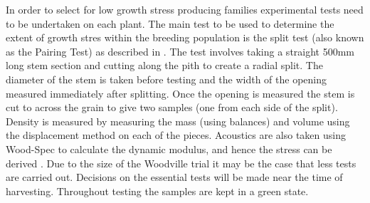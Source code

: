 In order to select for low growth stress producing families experimental tests
need to be undertaken on each plant. The main test to be used to determine the
extent of growth stres within the breeding population is the split test (also
known as the Pairing Test) as described in \cite{Chauhan_2010}. The test involves
taking a straight 500mm long stem section and cutting along the pith to create
a radial split. The diameter of the stem is taken before testing and the width
of the opening measured immediately after splitting. Once the opening is
measured the stem is cut to across the grain to give two samples (one from each
side of the split). Density is measured by measuring the mass (using balances)
and volume using the displacement method on each of the pieces. Acoustics are
also taken using Wood-Spec to calculate the dynamic modulus, and hence the
stress can be derived \cite{Chauhan_2010}. Due to the size of the Woodville trial it
may be the case that less tests are carried out. Decisions on the essential
tests will be made near the time of harvesting. Throughout testing the samples
are kept in a green state.